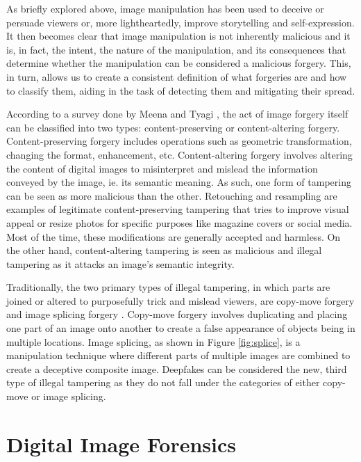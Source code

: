 As briefly explored above, image manipulation has been used to deceive or persuade viewers or, more lightheartedly, improve storytelling and self-expression. It then becomes clear that image manipulation is not inherently malicious and it is, in fact, the intent, the nature of the manipulation, and its consequences that determine whether the manipulation can be considered a malicious forgery. This, in turn, allows us to create a consistent definition of what forgeries are and how to classify them, aiding in the task of detecting them and mitigating their spread.

According to a survey done by Meena and Tyagi \cite{MeenaTyagi2019}, the act of image forgery itself can be classified into two types: content-preserving or content-altering forgery. Content-preserving forgery includes operations such as geometric transformation, changing the format, enhancement, etc. Content-altering forgery involves altering the content of digital images to misinterpret and mislead the information conveyed by the image, ie. its semantic meaning. As such, one form of tampering can be seen as more malicious than the other. Retouching and resampling are examples of legitimate content-preserving tampering that tries to improve visual appeal or resize photos for specific purposes like magazine covers or social media. Most of the time, these modifications are generally accepted and harmless. On the other hand, content-altering tampering is seen as malicious and illegal tampering as it attacks an image’s semantic integrity. 

Traditionally, the two primary types of illegal tampering, in which parts are joined or altered to purposefully trick and mislead viewers, are copy-move forgery and image splicing forgery \cite{Lian2010}. Copy-move forgery involves duplicating and placing one part of an image onto another to create a false appearance of objects being in multiple locations. Image splicing, as shown in Figure \ref{fig:splice}, is a manipulation technique where different parts of multiple images are combined to create a deceptive composite image. Deepfakes can be considered the new, third type of illegal tampering as they do not fall under the categories of either copy-move or image splicing. 

  \section{Digital Image Forensics} \label{sec:s2}

